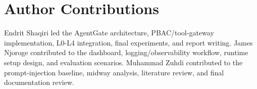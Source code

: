 \documentclass[11pt]{article}
\begin{document}
\section*{Author Contributions}

Endrit Shaqiri led the AgentGate architecture, PBAC/tool-gateway implementation, L0-L4 integration, final experiments, and report writing.
James Njoroge contributed to the dashboard, logging/observability workflow, runtime setup design, and evaluation scenarios.
Muhammad Zuhdi contributed to the prompt-injection baseline, midway analysis, literature review, and final documentation review.



\end{document}

